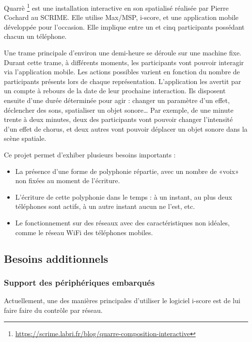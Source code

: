 \documentclass{article}
\begin{document}
Quarrè
\footnote{\url{https://scrime.labri.fr/blog/quarre-composition-interactive}} est une installation interactive en son spatialisé réalisée par Pierre Cochard au SCRIME. Elle utilise Max/MSP, i-score, et une application mobile développée pour l'occasion. 
Elle implique entre un et cinq participants possédant chacun un téléphone.

Une trame principale d'environ une demi-heure se déroule sur une machine fixe.
Durant cette trame, à différents moments, les participants vont pouvoir interagir via l'application mobile. 
Les actions possibles varient en fonction du nombre de participants présents lors de chaque représentation.
L'application les avertit par un compte à rebours de la date de leur prochaine interaction. 
Ils disposent ensuite d'une durée déterminée pour agir : changer un paramètre d'un effet, déclencher des sons, spatialiser un objet sonore\dots{}
Par exemple, de une minute trente à deux minutes, deux des participants vont pouvoir changer l'intensité d'un effet de chorus, et deux autres vont pouvoir déplacer un objet sonore dans la scène spatiale. 

Ce projet permet d'exhiber plusieurs besoins importants : 
\begin{itemize}
    \item La présence d'une forme de polyphonie répartie, avec un nombre de «voix» non fixées au moment de l'écriture.
    \item L'écriture de cette polyphonie dans le temps : à un instant, au plus deux téléphones sont actifs, à  un autre instant aucun ne l'est, etc.
    \item Le fonctionnement sur des réseaux avec des caractéristiques non idéales, comme le réseau WiFi des téléphones mobiles.
\end{itemize}

\subsection{Besoins additionnels}
\subsubsection{Support des périphériques embarqués}
Actuellement, une des manières principales d'utiliser le logiciel i-score est de lui faire faire du contrôle par réseau. 
\end{document}
